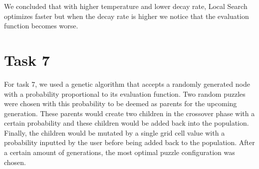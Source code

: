 \documentclass[11pt, oneside]{article}   	%
\begin{document}
We concluded that with higher temperature and lower decay rate, Local Search optimizes faster but when the decay rate is higher we notice that the evaluation function becomes worse.

\section{Task 7}

For task 7, we used a genetic algorithm that accepts a randomly generated node with a probability proportional to its evaluation function. Two random puzzles were chosen with this probability to be deemed as parents for the upcoming generation. These parents would create two children in the crossover phase with a certain probability and these children would be added back into the population. Finally, the children would be mutated by a single grid cell value with a probability inputted by the user before being added back to the population. After a certain amount of generations, the most optimal puzzle configuration was chosen.
\end{document}
